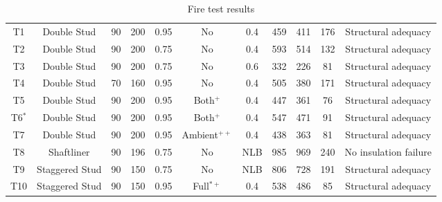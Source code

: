 \begin{sidewaystable}[!htbp]
	\begin{threeparttable}
		\begin{center}
			\caption{Fire test results}
				\begin{tabularx}{\textheight}{ccccccccccc}
					\toprule
					\multicolumn{1}{m{2.4em}}{\centering{Test Name}} & 
					\multicolumn{1}{m{5.6em}}{\centering{Description}} & 
					\multicolumn{1}{m{3 em}}{\centering{Stud Depth (mm)}} & 
					\multicolumn{1}{m{3 em}}{\centering{Cavity Depth (mm)}} & 
					\multicolumn{1}{m{5em}}{\centering{Stud Thickness (mm)}} & 
					\multicolumn{1}{m{4em}}{\centering{Cavity Insulation}} &
					\multicolumn{1}{m{3em}}{\centering{Load Ratio}} &
					\multicolumn{1}{m{3em}}{\centering{Critical HF \degree C}} &
					\multicolumn{1}{m{3em}}{\centering{Critical CF \degree C}} &
					\multicolumn{1}{m{3em}}{\centering{Failure Time}} &
					\multicolumn{1}{m{8em}}{\centering{Failure Criteria}} \\
					\midrule
					T1  & Double Stud & 90 & 200 & 0.95 & No & 0.4 & 459  & 411 & 176 & Structural adequacy \\
					T2  & Double Stud & 90 & 200 & 0.75 & No & 0.4 & 593  & 514 & 132 & Structural adequacy \\
					T3  & Double Stud & 90 & 200 & 0.75 & No & 0.6 & 332  & 226 & 81 & Structural adequacy \\
					T4  & Double Stud & 70 & 160 & 0.95 & No & 0.4 & 505 & 380 & 171 & Structural adequacy \\
					T5  & Double Stud & 90 & 200 & 0.95 & Both\(^+\) & 0.4 & 447 & 361 & 76 & Structural adequacy \\
					T6\(^*\)  & Double Stud & 90 & 200 & 0.95 & Both\(^+\) & 0.4 & 547 & 471 & 91 & Structural adequacy \\
					T7  & Double Stud & 90 & 200 & 0.95 & Ambient\(^{++}\) & 0.4 & 438 & 363 & 81 & Structural adequacy \\
					T8  & Shaftliner & 90 & 196 & 0.75 & No & NLB& 985 & 969 & 240 & No insulation failure \\
					T9  & Staggered Stud & 90 & 150 & 0.75 & No & NLB & 806 & 728 & 191 & Structural adequacy \\
					T10  & Staggered Stud & 90 & 150 & 0.95 & Full\(^{*+}\) & 0.4 & 538 & 486 & 85 & Structural adequacy \\
					\bottomrule
				\end{tabularx}%
				\label{tab:full-scale-summary}%
					\begin{tablenotes}

\end{tablenotes}
\end{center}
\end{threeparttable}
\end{sidewaystable}
